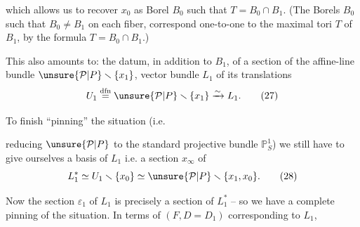 
which allows us  to recover $x_0$ as 
  Borel $B_0$ such that
$T=B_0\cap B_1$.
(The Borels $B_0$ such that $B_0\ne B_1$ on each fiber,
correspond one-to-one to the maximal tori $T$ of $B_1$, by the
 formula $T=B_0\cap B_1$.)

This also amounts to: the datum, in addition to $B_1$, 
of a section  of the affine-line bundle
$\unsure{\mathcal P|P}\smallsetminus\{x_1\}$,
vector bundle $L_1$ of its translations
\[
U_1\overset{\mathrm{dfn}}{=}\unsure{\mathcal P|P}\smallsetminus\{x_1\}\xrightarrow{\sim}L_1.
\tag{27}
\]

To finish ``pinning'' the situation (i.e.



reducing $\unsure{\mathcal P|P}$ to the standard projective bundle $\mathbb P^1_S$)
we still have to give ourselves a basis of $L_1$ i.e. a section $x_\infty$ of
\[
L_1^*\simeq U_1\smallsetminus\{x_0\}\simeq\unsure{\mathcal P|P}\smallsetminus\{x_1,x_0\}.
\tag{28}
\]

Now the section $\varepsilon_1$ of $L_1$ is precisely a section of $L_1^*$ -- so we have a complete pinning of the situation.
In terms of $(F,D=D_1)$ corresponding to $L_1$,

